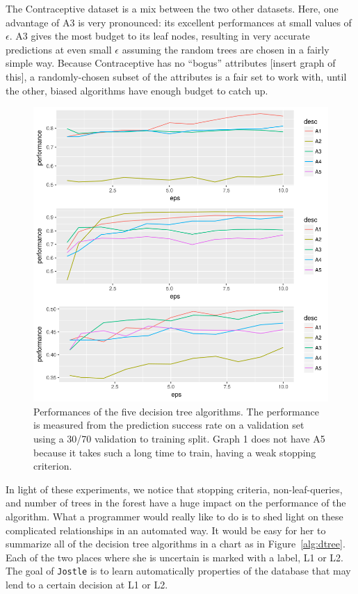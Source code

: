\documentclass[11pt]{report}
\newcommand{\Jostle}{\texttt{Jostle}}
\begin{document}
The Contraceptive dataset is a mix between the two other datasets. Here, one advantage of A3 is very pronounced: its excellent performances at small values of $\epsilon$. A3 gives the most budget to its leaf nodes, resulting in very accurate predictions at even small $\epsilon$ assuming the random trees are chosen in a fairly simple way. Because Contraceptive has no ``bogus'' attributes [insert graph of this], a randomly-chosen subset of the attributes is a fair set to work with, until the other, biased algorithms have enough budget to catch up.
\begin{figure}
\begin{center}
\includegraphics[scale=0.7]{Graph_Performances}
\end{center}
\caption{Performances of the five decision tree algorithms. The performance is measured from the prediction success rate on a validation set using a 30/70 validation to training split. Graph 1 does not have A5 because it takes such a long time to train, having a weak stopping criterion.}
\label{fig:datadep}
\end{figure}

In light of these experiments, we notice that stopping criteria, non-leaf-queries, and number of trees in the forest have a huge impact on the performance of the algorithm. What a programmer would really like to do is to shed light on these complicated relationships in an automated way. It would be easy for her to summarize all of the decision tree algorithms in a chart as in Figure~\ref{alg:dtree}. Each of the two places where she is uncertain is marked with a label, L1 or L2. The goal of \Jostle{} is to learn automatically properties of the database that may lend to a certain decision at L1 or L2.
\end{document}
